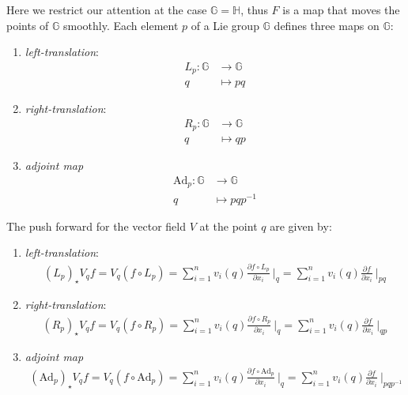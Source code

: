 \noindent
Here we restrict our attention at the case $\mathbb{G}=\mathbb{H}$, thus $F$ is a map that moves the points of $\mathbb{G}$ smoothly.
Each element $p$ of a Lie group $\mathbb{G}$ defines three maps on $\mathbb{G}$:
\begin{enumerate}
	\item \emph{left-translation}:
		\begin{align*}
		L_{p}: \mathbb{G} & \longrightarrow  \mathbb{G} \\
		q &\longmapsto pq
		\end{align*}
	\item \emph{right-translation}:
			\begin{align*}
			R_{p}: \mathbb{G} & \longrightarrow  \mathbb{G}\\
			q &\longmapsto qp
			\end{align*}
	\item \emph{adjoint map} 
			\begin{align*}
			\text{Ad}_{p}: \mathbb{G} & \longrightarrow  \mathbb{G} \\
			q &\longmapsto pqp^{-1}
			\end{align*}
\end{enumerate}
The push forward for the vector field $V$ at the point $q$ are given by:
\begin{enumerate}
	\item \emph{left-translation}:
	\begin{align*}
	(L_{p})_{\star}V_{q}f 
	=
	V_{q}(f\circ L_{p}) 
	=
	\sum_{i=1}^{n} v_{i}(q) \frac{\partial f \circ L_{p}}{\partial x_{i}} ~\Bigr|_{q} 
	=   
	\sum_{i=1}^{n} v_{i}(q) \frac{\partial f }{\partial x_{i}} ~\Bigr|_{pq} 
	\end{align*}
	\item \emph{right-translation}:
	\begin{align*}
	(R_{p})_{\star}V_{q}f 
	=
	V_{q}(f\circ R_{p}) 
	=
	\sum_{i=1}^{n} v_{i}(q) \frac{\partial f \circ R_{p}}{\partial x_{i}} ~\Bigr|_{q} 
	=   
	\sum_{i=1}^{n} v_{i}(q) \frac{\partial f }{\partial x_{i}} ~\Bigr|_{qp} 
	\end{align*}
	\item \emph{adjoint map} 
	\begin{align*}
	(\text{Ad}_{p})_{\star}V_{q}f 
	=
	V_{q}(f\circ \text{Ad}_{p}) 
	=
	\sum_{i=1}^{n} v_{i}(q) \frac{\partial f \circ \text{Ad}_{p}}{\partial x_{i}} ~\Bigr|_{q} 
	=   
	\sum_{i=1}^{n} v_{i}(q) \frac{\partial f }{\partial x_{i}} ~\Bigr|_{pqp^{-1}} 
	\end{align*}
\end{enumerate}
